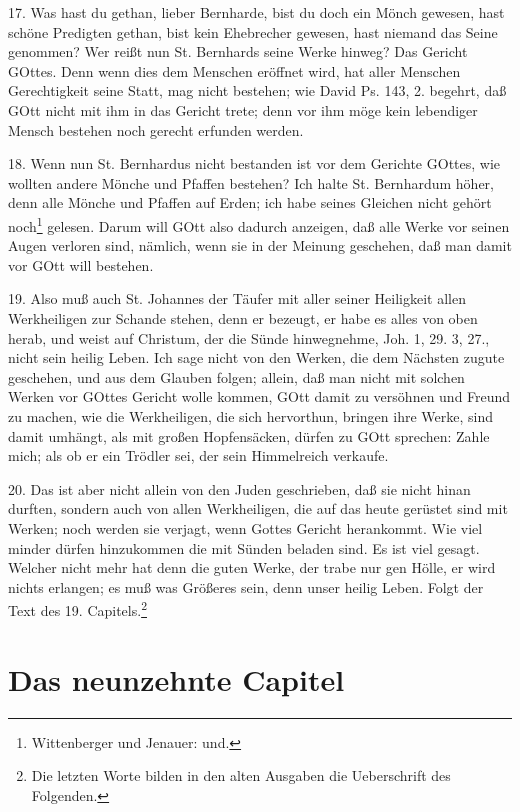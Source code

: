 17. Was hast du gethan, lieber Bernharde, bist du doch ein Mönch gewesen, hast schöne Predigten gethan, bist kein Ehebrecher gewesen, hast niemand das Seine genommen? Wer reißt nun St. Bernhards seine Werke hinweg? Das Gericht GOttes. Denn wenn dies dem Menschen eröffnet wird, hat aller Menschen Gerechtigkeit seine Statt, mag nicht bestehen; wie David Ps. 143, 2. begehrt, daß GOtt nicht mit ihm
in das Gericht trete; denn vor ihm möge kein lebendiger Mensch bestehen noch gerecht erfunden werden.

18. Wenn nun St. Bernhardus nicht bestanden ist vor dem Gerichte GOttes, wie wollten andere Mönche und Pfaffen bestehen? Ich halte St. Bernhardum höher, denn alle Mönche und Pfaffen auf Erden; ich habe seines Gleichen nicht gehört noch\footnote{Wittenberger und Jenauer: und.} gelesen. Darum will GOtt also dadurch anzeigen, daß alle Werke vor seinen Augen verloren sind, nämlich, wenn sie in der Meinung geschehen, daß man damit vor GOtt will bestehen.

19. Also muß auch St. Johannes der Täufer mit aller seiner Heiligkeit allen Werkheiligen zur Schande stehen, denn er bezeugt, er habe es alles von oben herab, und weist auf Christum, der die Sünde hinwegnehme, Joh. 1, 29. 3, 27., nicht sein heilig Leben. Ich sage nicht von den Werken, die dem Nächsten zugute geschehen, und aus dem Glauben folgen; allein, daß man nicht mit solchen Werken vor GOttes Gericht wolle kommen, GOtt damit zu versöhnen und Freund zu machen, wie die Werkheiligen, die sich hervorthun, bringen ihre Werke, sind damit umhängt, als mit großen Hopfensäcken, dürfen zu GOtt sprechen: Zahle mich; als ob er ein Trödler sei, der sein Himmelreich verkaufe.

20. Das ist aber nicht allein von den Juden geschrieben, daß sie nicht hinan durften, sondern auch von allen Werkheiligen, die auf das heute gerüstet sind mit Werken; noch werden sie verjagt, wenn Gottes Gericht herankommt. Wie viel minder dürfen hinzukommen die mit Sünden beladen sind. Es ist viel gesagt. Welcher nicht mehr hat denn die guten Werke, der trabe nur gen Hölle, er wird nichts erlangen; es muß was Größeres sein, denn unser heilig Leben. Folgt der Text des 19. Capitels.\footnote{Die letzten Worte bilden in den alten Ausgaben die Ueberschrift des Folgenden.}

\section{Das neunzehnte Capitel}

